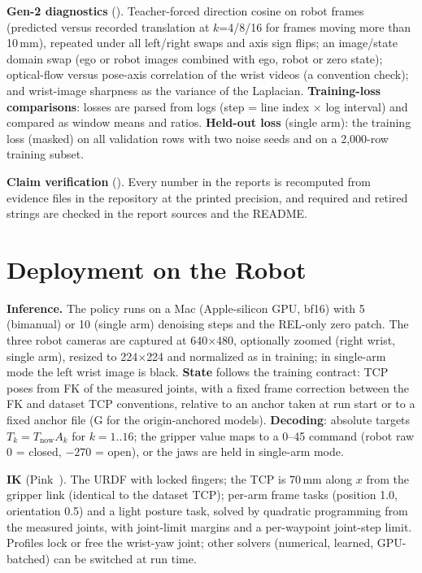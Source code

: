 \documentclass[conference,10pt]{IEEEtran}
\newcommand{\mm}{\,mm\xspace}
\begin{document}
\textbf{Gen-2 diagnostics} (). Teacher-forced direction cosine on robot frames (predicted versus recorded
translation at $k$=4/8/16 for frames moving more than 10\mm), repeated under all left/right swaps and axis sign flips; an image/state
domain swap (ego or robot images combined with ego, robot or zero state); optical-flow versus pose-axis correlation of the wrist
videos (a convention check); and wrist-image sharpness as the variance of the Laplacian. \textbf{Training-loss comparisons}: losses
are parsed from logs (step = line index $\times$ log interval) and compared as window means and ratios. \textbf{Held-out loss}
(single arm): the training loss (masked) on all validation rows with two noise seeds and on a 2{,}000-row training subset.

\textbf{Claim verification} (). Every number in the reports is recomputed from evidence files in the
repository at the printed precision, and required and retired strings are checked in the report sources and the README.

\section{Deployment on the Robot}\label{m:sec:deploy}
\textbf{Inference.} The policy runs on a Mac (Apple-silicon GPU, bf16) with 5 (bimanual) or 10 (single arm) denoising steps and the
REL-only zero patch. The three robot cameras are captured at 640$\times$480, optionally zoomed (right wrist, single arm), resized to
224$\times$224 and normalized as in training; in single-arm mode the left wrist image is black. \textbf{State} follows the training
contract: TCP poses from FK of the measured joints, with a fixed frame correction between the FK and dataset TCP conventions, relative
to an anchor taken at run start or to a fixed anchor file (G for the origin-anchored models). \textbf{Decoding}: absolute targets
$T_k=T_\text{now}A_k$ for $k=1..16$; the gripper value maps to a 0--45 command (robot raw 0 = closed, $-270$ = open), or the jaws are
held in single-arm mode.

\textbf{IK} (Pink~\cite{caron2024pink}). The URDF with locked fingers; the TCP is 70\mm{} along $x$ from the gripper link (identical to
the dataset TCP); per-arm frame tasks (position 1.0, orientation 0.5) and a light posture task, solved by quadratic programming from the
measured joints, with joint-limit margins and a per-waypoint joint-step limit. Profiles lock or free the wrist-yaw joint; other solvers
(numerical, learned, GPU-batched) can be switched at run time.
\end{document}
